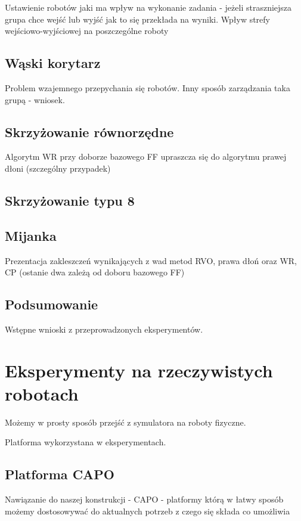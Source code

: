 Ustawienie robotów jaki ma wpływ na wykonanie zadania - jeżeli straszniejsza grupa chce wejść lub wyjść jak to się przekłada na wyniki.
Wpływ strefy wejściowo-wyjściowej na poszczególne roboty 

\subsection{Wąski korytarz}

Problem wzajemnego przepychania się robotów.
Inny sposób zarządzania taka grupą - wniosek.

\subsection{Skrzyżowanie równorzędne}

Algorytm WR przy doborze bazowego FF upraszcza się  do algorytmu prawej dłoni (szczególny przypadek)

\subsection{Skrzyżowanie typu 8}

\subsection{Mijanka}

Prezentacja zakleszczeń wynikających z wad metod RVO, prawa dłoń oraz WR, CP (ostanie dwa zależą od doboru bazowego FF)

\subsection{Podsumowanie}

Wstępne wnioski z przeprowadzonych eksperymentów.

\section{Eksperymenty na rzeczywistych robotach}

Możemy w prosty sposób przejść z symulatora na roboty fizyczne.

Platforma wykorzystana w eksperymentach.

\subsection{Platforma CAPO}

Nawiązanie do naszej konstrukcji - CAPO - platformy którą w łatwy sposób możemy dostosowywać do aktualnych potrzeb z czego się składa co umożliwia 

